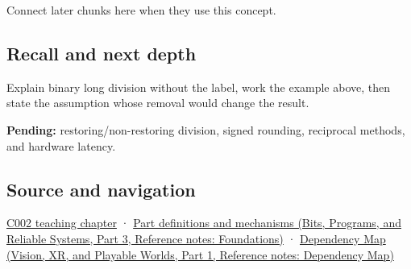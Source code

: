 \hypertarget{appendix-89985e6a2685-used-by}{}

Connect later chunks here when they use this concept.

\subsection{Recall and next depth}\label{appendix-89985e6a2685-recall-and-next-depth}

\hypertarget{appendix-89985e6a2685-recall-and-next-depth}{}

Explain binary long division without the label, work the example above, then state the assumption whose removal would change the result.

\textbf{Pending:} restoring/non-restoring division, signed rounding, reciprocal methods, and hardware latency.

\subsection{Source and navigation}\label{appendix-89985e6a2685-source-and-navigation}

\hypertarget{appendix-89985e6a2685-source-and-navigation}{}

\hyperref[01-foundations-i-ch001-arithmetic-becomes-a-policy]{C002 teaching chapter} · \href{../01-Bits-Programs-and-Reliable-Systems-P03/main.pdf\#nameddest=appendix-fd090d982a15}{Part definitions and mechanisms (Bits, Programs, and Reliable Systems, Part 3, Reference notes: Foundations)} · \href{../07-Vision-XR-and-Playable-Worlds-P01/main.pdf\#nameddest=appendix-4ad47bdd269a}{Dependency Map (Vision, XR, and Playable Worlds, Part 1, Reference notes: Dependency Map)}
